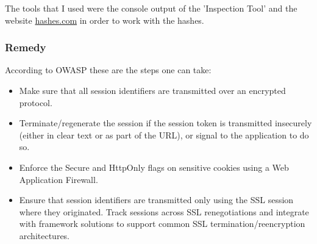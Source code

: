 The tools that I used were the console output of the 'Inspection Tool'
and the website \href{http://www.hashes.com}{hashes.com} in order to work
with the hashes.

\subsubsection{Remedy}

According to OWASP\cite{OWASP} these are the steps one can take:
\begin{itemize}
    \item Make sure that all session identifiers are transmitted over an encrypted protocol.
    \item Terminate/regenerate the session if the session token is transmitted insecurely (either in clear text or as part of the URL), or signal to the application to do so.
    \item Enforce the Secure and HttpOnly flags on sensitive cookies using a Web Application Firewall.
    \item Ensure that session identifiers are transmitted only using the SSL session where they originated. Track sessions across SSL renegotiations and integrate with framework solutions to support common SSL termination/reencryption architectures.
\end{itemize}